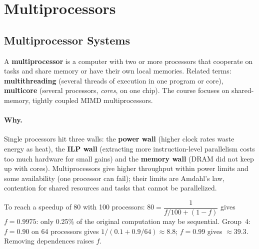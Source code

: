 \section{Multiprocessors}
\label{sec:mp}

\subsection{Multiprocessor Systems}
\label{sec:mp-systems}

\begin{definition}[Multiprocessor]
A \textbf{multiprocessor} is a computer with two or more processors that
cooperate on tasks and share memory or have their own local memories. Related
terms: \textbf{multithreading} (several threads of execution in one program or
core), \textbf{multicore} (several processors, \emph{cores}, on one chip). The
course focuses on shared-memory, tightly coupled MIMD
multiprocessors.
\end{definition}

\paragraph{Why.} Single processors hit three walls: the \textbf{power wall} (higher
clock rates waste energy as heat), the \textbf{ILP wall} (extracting more
instruction-level parallelism costs too much hardware for small gains) and the
\textbf{memory wall} (DRAM did not keep up with cores). Multiprocessors give higher
throughput within power limits and some availability (one processor can fail);
their limits are Amdahl's law, contention for shared resources and tasks that cannot
be parallelized.

\begin{eg}
To reach a speedup of 80 with 100 processors: $80=\dfrac{1}{f/100+(1-f)}$ gives
$f=0.9975$: only 0.25\% of the original computation may be
sequential. Group~4: $f=0.90$ on 64 processors gives
$1/(0.1+0.9/64)\approx8.8$; $f=0.99$ gives $\approx39.3$. Removing dependences
raises $f$.
\end{eg}


